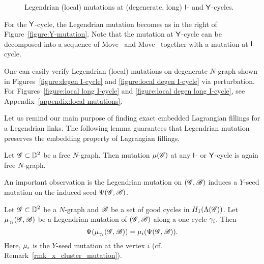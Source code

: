 \begin{figure}[ht]
{{
}}
\caption{Legendrian (local) mutations at (degenerate, long) $\mathsf{I}$- and $\mathsf{Y}$-cycles.}
\label{fig:Legendrian mutation on N-graphs}
\end{figure}

For the $\mathsf{Y}$-cycle, the Legendrian mutation becomes as in the right of Figure~\ref{figure:Y-mutation}.
Note that the mutation at $\mathsf{Y}$-cycle can be decomposed into a sequence of Move~ and Move~ together with a mutation at $\mathsf{I}$-cycle.

One can easily verify Legendrian (local) mutations on degenerate $N$-graph shown in Figures~\ref{figure:degen I-cycle} and \ref{figure:local degen I-cycle} via perturbation.
For Figures~\ref{figure:local long I-cycle} and \ref{figure:local degen long I-cycle}, see Appendix~\ref{appendix:local mutations}.

Let us remind our main purpose of finding exact embedded Lagrangian fillings for a Legendrian links.
The following lemma guarantees that Legendrian mutation preserves the embedding property of Lagrangian fillings.
\begin{proposition}\cite[Lemma~7.4]{CZ2020}
Let $\mathscr{G}\subset \mathbb{D}^2$ be a free $N$-graph. Then mutation $\mu(\mathscr{G})$ at any $\mathsf{I}$- or $\mathsf{Y}$-cycle is again free $N$-graph. 
\end{proposition}

An important observation is the Legendrian mutation on $(\mathscr{G},\mathscr{B})$ induces a $Y$-seed mutation on the induced seed $\Psi(\mathscr{G},\mathscr{B})$.

\begin{proposition}[{\cite[\S7.2]{CZ2020}}]\label{proposition:equivariance of mutations}
Let $\mathscr{G}\subset \mathbb{D}^2$ be a $N$-graph and $\mathscr{B}$ be a set of good cycles in $H_1(\Lambda(\mathscr{G}))$.
Let $\mu_{\gamma_i}(\mathscr{G},\mathscr{B})$ be a Legendrian mutation of $(\mathscr{G},\mathscr{B})$ along a one-cycle $\gamma_i$. Then
\[
\Psi(\mu_{\gamma_i}(\mathscr{G},\mathscr{B}))=\mu_{i}(\Psi(\mathscr{G},\mathscr{B})).
\]
Here, $\mu_{i}$ is the $Y$-seed mutation 
at the vertex $i$ \textup{(}cf. Remark~\ref{rmk_x_cluster_mutation}\textup{)}.
\end{proposition}


